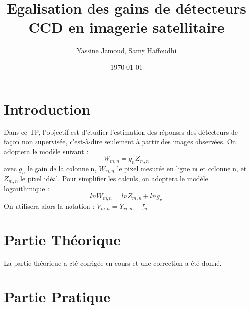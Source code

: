 \documentclass[12pt,a4paper,titlepage]{article}
\title{Egalisation des gains de détecteurs CCD en imagerie satellitaire}
\author{Yassine Jamoud, Samy Haffoudhi}
\date{\today}
\begin{document}
\maketitle

\section*{Introduction}
Dans ce TP, l'objectif est d'étudier l’estimation des réponses des détecteurs de façon non supervisée, c’est-à-dire seulement à partir des images observées. On adoptera le modèle suivant :
$$
	W_{m,n}=g_nZ_{m,n}
$$
avec $g_n$ le gain de la colonne n, $W_{m,n}$ le pixel mesurée en ligne m et colonne n, et $Z_{m,n}$ le pixel
idéal. Pour simplifier les calculs, on adoptera le modèle logarithmique :
$$
	ln W_{m,n} = ln Z_{m,n} + ln g_n
$$
On utilisera alors la notation : $V_{m,n} = Y_{m,n} +f_n$
\section{Partie Théorique}
La partie théorique a été corrigée en cours et une correction a été donné.




\section{Partie Pratique}
\end{document}
